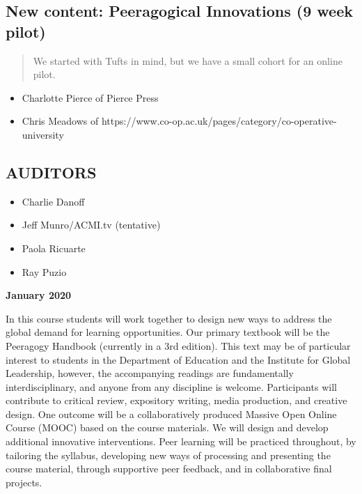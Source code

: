 \hypertarget{new-content-peeragogical-innovations-9-week-pilot}{%
\subsection{New content: Peeragogical Innovations (9 week
pilot)}\label{new-content-peeragogical-innovations-9-week-pilot}}

\begin{quote}
We started with Tufts in mind, but we have a small cohort for an online
pilot.
\end{quote}

\begin{itemize}
\tightlist
\item
  Charlotte Pierce of Pierce Press
\item
  Chris Meadows of
  https://www.co-op.ac.uk/pages/category/co-operative-university
\end{itemize}

\hypertarget{auditors}{%
\subsection{AUDITORS}\label{auditors}}

\begin{itemize}
\tightlist
\item
  Charlie Danoff
\item
  Jeff Munro/ACMI.tv (tentative)
\item
  Paola Ricuarte
\item
  Ray Puzio
\end{itemize}

\textbf{January 2020}

In this course students will work together to design new ways to address
the global demand for learning opportunities. Our primary textbook will
be the Peeragogy Handbook (currently in a 3rd edition). This text may be
of particular interest to students in the Department of Education and
the Institute for Global Leadership, however, the accompanying readings
are fundamentally interdisciplinary, and anyone from any discipline is
welcome. Participants will contribute to critical review, expository
writing, media production, and creative design. One outcome will be a
collaboratively produced Massive Open Online Course (MOOC) based on the
course materials. We will design and develop additional innovative
interventions. Peer learning will be practiced throughout, by tailoring
the syllabus, developing new ways of processing and presenting the
course material, through supportive peer feedback, and in collaborative
final projects.

